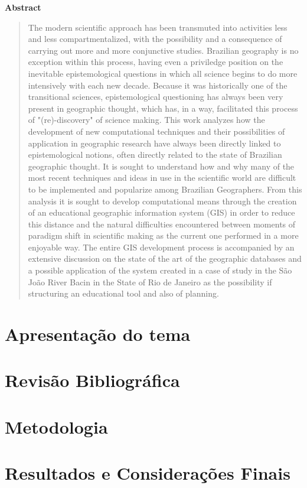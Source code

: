 \documentclass[12pt,a4paper,openany]{book} %
\begin{document}
	\newpage
	\begin{center}
		\textbf{\LARGE Abstract}
	\end{center}
	\begin{quote}
		The modern scientific approach has been transmuted into activities less and less compartmentalized, with the possibility and a consequence of carrying out more and more conjunctive studies. Brazilian geography is no exception within this process, having even a priviledge position on the inevitable epistemological questions in which all science begins to do more intensively with each new decade. Because it was historically one of the transitional sciences, epistemological questioning has always been very present in geographic thought, which has, in a way, facilitated this process of "(re)-discovery" of science making.
		This work analyzes how the development of new computational techniques and their possibilities of application in geographic research have always been directly linked to epistemological notions, often directly related to the state of Brazilian geographic thought. It is sought to understand how and why many of the most recent techniques and ideas in use in the scientific world are difficult to be implemented and popularize among Brazilian Geographers.
		From this analysis it is sought to develop computational means through the creation of an educational geographic information system (GIS) in order to reduce this distance and the natural difficulties encountered between moments of paradigm shift in scientific making as the current one performed in a more enjoyable way.
		The entire GIS development process is accompanied by an extensive discussion on the state of the art of the geographic databases and a possible application of the system created in a case of study in the São João River Bacin in the State of Rio de Janeiro as the possibility if structuring an educational tool and also of planning.
	\end{quote}

	\part{Apresentação do tema}
	
	
	
	\part{Revisão Bibliográfica}
	
	
	\part{Metodologia}
	
	
	\part{Resultados e Considerações Finais}
	
	
	
	
	
	\appendix
	
	
\end{document}
